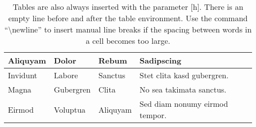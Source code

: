 \begin{table}[h] %
	\caption[Od quo tecto offic torit eteum acerum fuga. Ideni omnihic idundero doluptus iminvel luptati busdaepta sequi dolorec tatessinum.]{Tables are also always inserted with the parameter [h]. There is an empty line before and after the table environment. Use the command ``\textbackslash newline'' to insert manual line breaks if the spacing between words in a cell becomes too large.}
	\centering
	\begin{tabular}{ | l | l | l | p{2.5cm} |}
			\hline
			Aliquyam & Dolor & Rebum & Sadipscing \\ \hline
			Invidunt & Labore & Sanctus & Stet clita kasd \newline gubergren. \\ \hline
			Magna & Gubergren & Clita & No sea takimata \newline sanctus. \\ \hline
			Eirmod & Voluptua & Aliquyam & Sed diam nonumy eirmod tempor. \\
			\hline
	\end{tabular}
	\label{tab:tab}
\end{table}

